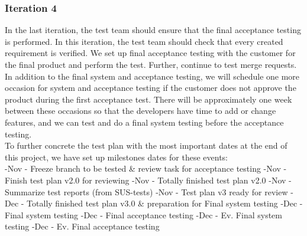 \subsubsection{Iteration 4}
In the last iteration, the test team should ensure that the final acceptance testing is performed. In this iteration, the test team should check that every created requirement is verified.     
We set up final acceptance testing with the customer for the final product and perform the test. Further, continue to test merge requests. In addition to the final system and acceptance testing, we will schedule one more occasion for system and acceptance testing if the customer does not approve the product during the first acceptance test. There will be approximately one week between these occasions so that the developers have time to add or change features, and we can test and do a final system testing before the acceptance testing. \\


\noindent To further concrete the test plan with the most important dates at the end of this project, we have set up milestones dates for these events:\\
-Nov - Freeze branch to be tested \& review task for acceptance testing\newline
{}-Nov - Finish test plan v2.0 for reviewing\newline
{}-Nov - Totally finished test plan v2.0\newline
{}-Nov - Summarize test reports (from SUS-tests)\newline
{}-Nov - Test plan v3 ready for review\newline
{}-Dec - Totally finished test plan v3.0 \& preparation for Final system testing\newline
{}-Dec - Final system testing\newline
{}-Dec - Final acceptance testing\newline
{}-Dec - Ev. Final system testing\newline
{}-Dec - Ev. Final acceptance testing\newline



